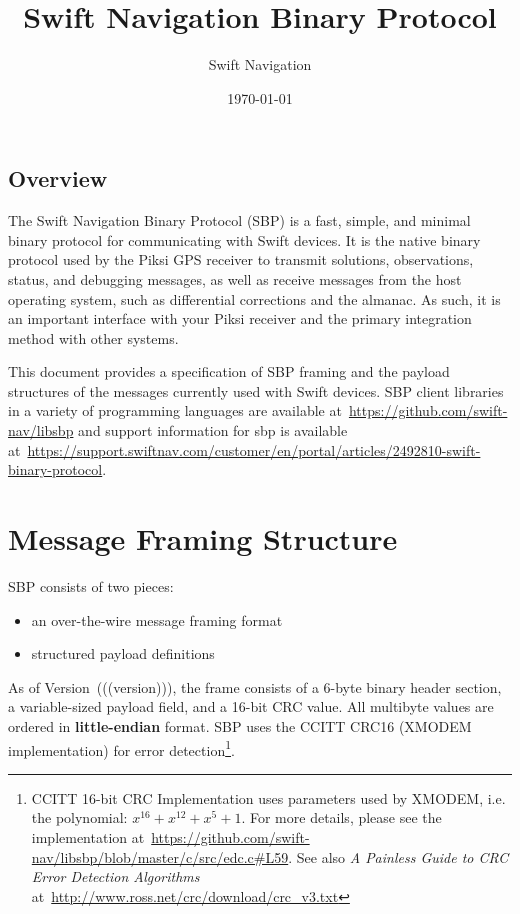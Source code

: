 \documentclass[9pt]{extarticle}
\title{Swift Navigation Binary Protocol}
\author{Swift Navigation}
\date{\today}
\makeatletter
\numberwithin{table}{subsection}
\numberwithin{field}{subsection}
\renewcommand{\version}{(((version)))}
\renewcommand\tableofcontents{\@starttoc{toc}}
\makeatother
\begin{document}
\maketitle
\begin{normalsize}
\setcounter{tocdepth}{2}
\begin{centering}
\tableofcontents
\end{centering}
\end{normalsize}

\thispagestyle{firstpage}
\bigskip
\bigskip
\begin{large}
\section{Overview}
\label{sec:Overview}
The Swift Navigation Binary Protocol (SBP) is a fast, simple, and
minimal binary protocol for communicating with Swift devices. It is
the native binary protocol used by the Piksi GPS receiver to transmit
solutions, observations, status, and debugging messages, as well as
receive messages from the host operating system, such as differential
corrections and the almanac. As such, it is an important interface
with your Piksi receiver and the primary integration method with other
systems.

This document provides a specification of SBP framing and the payload
structures of the messages currently used with Swift devices. SBP
client libraries in a variety of programming languages are available
at~\url{https://github.com/swift-nav/libsbp} and support information
for sbp is available at~\url{https://support.swiftnav.com/customer/en/portal/articles/2492810-swift-binary-protocol}.

\end{large}

\newpage
\section{Message Framing Structure}
\label{sec:Message}

\begin{large}
SBP consists of two pieces:
\begin{itemize}
  \item an over-the-wire message framing format
  \item structured payload definitions
\end{itemize}
As of Version~\version, the frame consists of a 6-byte binary
header section, a variable-sized payload field, and a 16-bit CRC
value. All multibyte values are ordered in \textbf{little-endian}
format. SBP uses the CCITT CRC16 (XMODEM implementation) for error
detection\footnote{CCITT 16-bit CRC Implementation uses parameters
  used by XMODEM, i.e. the polynomial: $x^{16} + x^{12} + x^5 +
  1$. For more details, please see the implementation
  at~\url{https://github.com/swift-nav/libsbp/blob/master/c/src/edc.c\#L59}. See
  also \emph{A Painless Guide to CRC Error Detection Algorithms}
  at~\url{http://www.ross.net/crc/download/crc_v3.txt}}.

\end{large}
\end{document}
